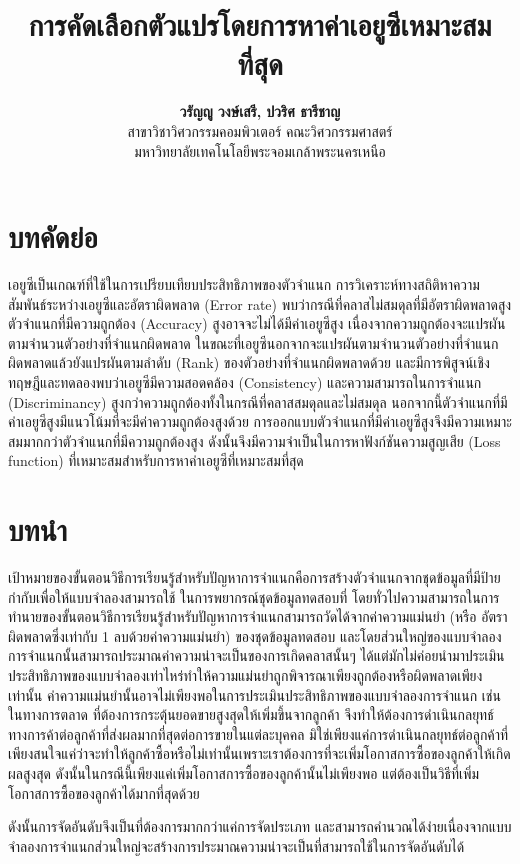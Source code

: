 \documentclass[twoside, twocolumn, 12pt]{article}
\title{การคัดเลือกตัวแปรโดยการหาค่าเอยูซีเหมาะสมที่สุด}
\author{%
\textbf{วรัญญู วงษ์เสรี, ปวริศ ธารีชาญ}\\[1ex]
 สาขาวิชาวิศวกรรมคอมพิวเตอร์ คณะวิศวกรรมศาสตร์  \\ มหาวิทยาลัยเทคโนโลยีพระจอมเกล้าพระนครเหนือ %
}
\date{}
\begin{document}
\maketitle
\section*{บทคัดย่อ}
\quad เอยูซีเป็นเกณฑ์ที่ใช้ในการเปรียบเทียบประสิทธิภาพของตัวจำแนก การวิเคราะห์ทางสถิติหาความสัมพันธ์ระหว่างเอยูซีและอัตราผิดพลาด (Error rate) พบว่ากรณีที่คลาสไม่สมดุลที่มีอัตราผิดพลาดสูง ตัวจำแนกที่มีความถูกต้อง (Accuracy) สูงอาจจะไม่ได้มีค่าเอยูซีสูง เนื่องจากความถูกต้องจะแปรผันตามจำนวนตัวอย่างที่จำแนกผิดพลาด ในขณะที่เอยูซีนอกจากจะแปรผันตามจำนวนตัวอย่างที่จำแนกผิดพลาดแล้วยังแปรผันตามลำดับ (Rank) ของตัวอย่างที่จำแนกผิดพลาดด้วย และมีการพิสูจน์เชิงทฤษฎีและทดลองพบว่าเอยูซีมีความสอดคล้อง (Consistency) และความสามารถในการจำแนก (Discriminancy) สูงกว่าความถูกต้องทั้งในกรณีที่คลาสสมดุลและไม่สมดุล นอกจากนี้ตัวจำแนกที่มีค่าเอยูซีสูงมีแนวโน้มที่จะมีค่าความถูกต้องสูงด้วย การออกแบบตัวจำแนกที่มีค่าเอยูซีสูงจึงมีความเหมาะสมมากกว่าตัวจำแนกที่มีความถูกต้องสูง ดังนั้นจึงมีความจำเป็นในการหาฟังก์ชันความสูญเสีย (Loss function) ที่เหมาะสมสำหรับการหาค่าเอยูซีที่เหมาะสมที่สุด
\section{บทนำ}
เป้าหมายของขั้นตอนวิธีการเรียนรู้สำหรับปัญหาการจำแนกคือการสร้างตัวจำแนกจากชุดข้อมูลที่มีป้ายกำกับเพื่อให้แบบจำลองสามารถใช้ ในการพยากรณ์ชุดข้อมูลทดสอบที่ โดยทั่วไปความสามารถในการทำนายของขั้นตอนวิธีการเรียนรู้สำหรับปัญหาการจำแนกสามารถวัดได้จากค่าความแม่นยำ (หรือ อัตราผิดพลาดซึ่งเท่ากับ 1 ลบด้วยค่าความแม่นยำ) ของชุดข้อมูลทดสอบ และโดยส่วนใหญ่ของแบบจำลองการจำแนกนั้นสามารถประมาณค่าความน่าจะเป็นของการเกิดคลาสนั้นๆ ได้แต่มักไม่ค่อยนำมาประเมินประสิทธิภาพของแบบจำลองเท่าไหร่ทำให้ความแม่นยำถูกพิจารณาเพียงถูกต้องหรือผิดพลาดเพียงเท่านั้น 
ค่าความแม่นยำนั้นอาจไม่เพียงพอในการประเมินประสิทธิภาพของแบบจำลองการจำแนก เช่น ในทางการตลาด ที่ต้องการกระตุ้นยอดขายสูงสุดให้เพิ่มขึ้นจากลูกค้า จึงทำให้ต้องการดําเนินกลยุทธ์ทางการค้าต่อลูกค้าที่ส่งผลมากที่สุดต่อการขายในแต่ละบุคคล มิใช่เพียงแค่การดําเนินกลยุทธ์ต่อลูกค้าที่เพียงสนใจแค่ว่าจะทำให้ลูกค้าซื้อหรือไม่เท่านั้นเพราะเราต้องการที่จะเพิ่มโอกาสการซื้อของลูกค้าให้เกิดผลสูงสุด ดังนั้นในกรณีนี้เพียงแค่เพิ่มโอกาสการซื้อของลูกค้านั้นไม่เพียงพอ แต่ต้องเป็นวิธีที่เพิ่มโอกาสการซื้อของลูกค้าได้มากที่สุดด้วย

ดังนั้นการจัดอันดับจึงเป็นที่ต้องการมากกว่าแค่การจัดประเภท และสามารถคำนวณได้ง่ายเนื่องจากแบบจำลองการจำแนกส่วนใหญ่จะสร้างการประมาณความน่าจะเป็นที่สามารถใช้ในการจัดอันดับได้
\end{document}
